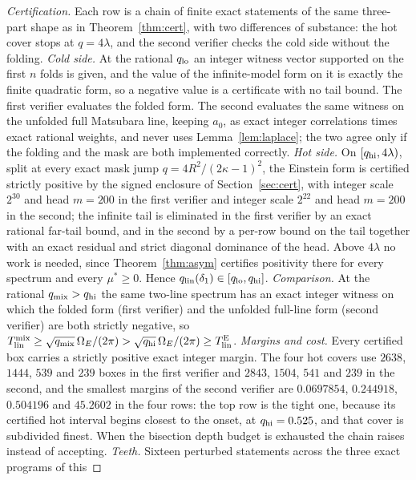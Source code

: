 \documentclass[11pt]{article}
\newcommand{\Tlin}{T_{\mathrm{lin}}}
\newcommand{\OmE}{\Omega_E}
\newcommand{\muS}{\mu^{*}}
\theoremstyle{definition}
\theoremstyle{remark}
\begin{document}
\begin{proof}[Certification]
Each row is a chain of finite exact statements of the same three-part shape as in
Theorem~\ref{thm:cert}, with two differences of substance: the hot cover stops at
$q=4\lambda$, and the second verifier checks the cold side without the folding.
\emph{Cold side.} At the rational $q_{\rm lo}$ an integer witness vector supported on the
first $n$ folds is given, and the value of the infinite-model form on it is exactly the
finite quadratic form, so a negative value is a certificate with no tail bound. The first
verifier evaluates the folded form. The second evaluates the same witness on the unfolded
full Matsubara line, keeping $a_0$, as exact integer correlations times exact rational
weights, and never uses Lemma~\ref{lem:laplace}; the two agree only if the folding and the
mask are both implemented correctly.
\emph{Hot side.} On $[q_{\rm hi},4\lambda)$, split at every exact mask jump
$q=4R^2/(2\kappa-1)^2$, the Einstein form is certified strictly positive by the signed
enclosure of Section~\ref{sec:cert}, with integer scale $2^{30}$ and head $m=200$ in the
first verifier and integer scale $2^{22}$ and head $m=200$ in the second; the infinite tail
is eliminated in the first verifier by an exact rational far-tail bound, and in the second
by a per-row bound on the tail together with an exact residual and strict diagonal
dominance of the head. Above $4\lambda$ no work is needed, since
Theorem~\ref{thm:asym} certifies positivity there for every spectrum and every
$\muS\ge0$. Hence $q_{\rm lin}(\delta_1)\in[q_{\rm lo},q_{\rm hi}]$.
\emph{Comparison.} At the rational $q_{\rm mix}>q_{\rm hi}$ the same two-line spectrum has
an exact integer witness on which the folded form (first verifier) and the unfolded
full-line form (second verifier) are both strictly negative, so
$\Tlin^{\rm mix}\ge\sqrt{q_{\rm mix}}\,\OmE/(2\pi)>\sqrt{q_{\rm hi}}\,\OmE/(2\pi)\ge
\Tlin^{\rm E}$.
\emph{Margins and cost.} Every certified box carries a strictly positive exact integer
margin. The four hot covers use $2638$, $1444$, $539$ and $239$ boxes in the first
verifier and $2843$, $1504$, $541$ and $239$ in the second, and the smallest margins of
the second verifier are $0.0697854$, $0.244918$, $0.504196$ and $45.2602$ in the four
rows: the top row is the tight one, because its certified hot interval begins closest to
the onset, at $q_{\rm hi}=0.525$, and that cover is subdivided finest. When the bisection
depth budget is exhausted the chain raises instead of accepting.
\emph{Teeth.} Sixteen perturbed statements across the three exact programs of this

\end{proof}
\end{document}
